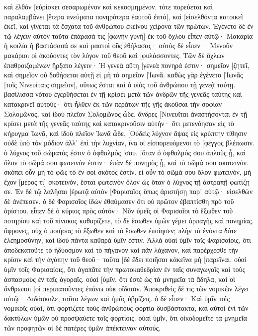 καὶ ἐλθὸν [εὑρίσκει σεσαρωμένον καὶ κεκοσμημένον. 
τότε πορεύεται καὶ παραλαμβάνει [ἕτερα πνεύματα πονηρότερα ἑαυτοῦ ἑπτά], καὶ [εἰσελθόντα κατοικεῖ ἐκεῖ, καὶ γίνεται τὰ ἔσχατα τοῦ ἀνθρώπου ἐκείνου χείρονα τῶν πρώτων. 
Ἐγένετο δὲ ἐν τῷ λέγειν αὐτὸν ταῦτα ἐπάρασά τις [φωνὴν γυνὴ] ἐκ τοῦ ὄχλου εἶπεν αὐτῷ· Μακαρία ἡ κοιλία ἡ βαστάσασά σε καὶ μαστοὶ οὓς ἐθήλασας· 
αὐτὸς δὲ εἶπεν· [Μενοῦν μακάριοι οἱ ἀκούοντες τὸν λόγον τοῦ θεοῦ καὶ [φυλάσσοντες. 
Τῶν δὲ ὄχλων ἐπαθροιζομένων ἤρξατο λέγειν· Ἡ γενεὰ αὕτη [γενεὰ πονηρά ἐστιν· σημεῖον [ζητεῖ, καὶ σημεῖον οὐ δοθήσεται αὐτῇ εἰ μὴ τὸ σημεῖον [Ἰωνᾶ. 
καθὼς γὰρ ἐγένετο [Ἰωνᾶς [τοῖς Νινευίταις σημεῖον], οὕτως ἔσται καὶ ὁ υἱὸς τοῦ ἀνθρώπου τῇ γενεᾷ ταύτῃ. 
βασίλισσα νότου ἐγερθήσεται ἐν τῇ κρίσει μετὰ τῶν ἀνδρῶν τῆς γενεᾶς ταύτης καὶ κατακρινεῖ αὐτούς· ὅτι ἦλθεν ἐκ τῶν περάτων τῆς γῆς ἀκοῦσαι τὴν σοφίαν Σολομῶνος, καὶ ἰδοὺ πλεῖον Σολομῶνος ὧδε. 
ἄνδρες [Νινευῖται ἀναστήσονται ἐν τῇ κρίσει μετὰ τῆς γενεᾶς ταύτης καὶ κατακρινοῦσιν αὐτήν· ὅτι μετενόησαν εἰς τὸ κήρυγμα Ἰωνᾶ, καὶ ἰδοὺ πλεῖον Ἰωνᾶ ὧδε. 
[Οὐδεὶς λύχνον ἅψας εἰς κρύπτην τίθησιν οὐδὲ ὑπὸ τὸν μόδιον ἀλλ᾽ ἐπὶ τὴν λυχνίαν, ἵνα οἱ εἰσπορευόμενοι τὸ [φέγγος βλέπωσιν. 
ὁ λύχνος τοῦ σώματός ἐστιν ὁ ὀφθαλμός [σου. [ὅταν ὁ ὀφθαλμός σου ἁπλοῦς ᾖ, καὶ ὅλον τὸ σῶμά σου φωτεινόν ἐστιν· ἐπὰν δὲ πονηρὸς ᾖ, καὶ τὸ σῶμά σου σκοτεινόν. 
σκόπει οὖν μὴ τὸ φῶς τὸ ἐν σοὶ σκότος ἐστίν. 
εἰ οὖν τὸ σῶμά σου ὅλον φωτεινόν, μὴ ἔχον [μέρος τι] σκοτεινόν, ἔσται φωτεινὸν ὅλον ὡς ὅταν ὁ λύχνος τῇ ἀστραπῇ φωτίζῃ σε. 
Ἐν δὲ τῷ λαλῆσαι [ἐρωτᾷ αὐτὸν [Φαρισαῖος ὅπως ἀριστήσῃ παρ᾽ αὐτῷ· εἰσελθὼν δὲ ἀνέπεσεν. 
ὁ δὲ Φαρισαῖος ἰδὼν ἐθαύμασεν ὅτι οὐ πρῶτον ἐβαπτίσθη πρὸ τοῦ ἀρίστου. 
εἶπεν δὲ ὁ κύριος πρὸς αὐτόν· Νῦν ὑμεῖς οἱ Φαρισαῖοι τὸ ἔξωθεν τοῦ ποτηρίου καὶ τοῦ πίνακος καθαρίζετε, τὸ δὲ ἔσωθεν ὑμῶν γέμει ἁρπαγῆς καὶ πονηρίας. 
ἄφρονες, οὐχ ὁ ποιήσας τὸ ἔξωθεν καὶ τὸ ἔσωθεν ἐποίησεν; 
πλὴν τὰ ἐνόντα δότε ἐλεημοσύνην, καὶ ἰδοὺ πάντα καθαρὰ ὑμῖν ἐστιν. 
Ἀλλὰ οὐαὶ ὑμῖν τοῖς Φαρισαίοις, ὅτι ἀποδεκατοῦτε τὸ ἡδύοσμον καὶ τὸ πήγανον καὶ πᾶν λάχανον, καὶ παρέρχεσθε τὴν κρίσιν καὶ τὴν ἀγάπην τοῦ θεοῦ· ταῦτα [δὲ ἔδει ποιῆσαι κἀκεῖνα μὴ [παρεῖναι. 
οὐαὶ ὑμῖν τοῖς Φαρισαίοις, ὅτι ἀγαπᾶτε τὴν πρωτοκαθεδρίαν ἐν ταῖς συναγωγαῖς καὶ τοὺς ἀσπασμοὺς ἐν ταῖς ἀγοραῖς. 
οὐαὶ [ὑμῖν, ὅτι ἐστὲ ὡς τὰ μνημεῖα τὰ ἄδηλα, καὶ οἱ ἄνθρωποι [οἱ περιπατοῦντες ἐπάνω οὐκ οἴδασιν. 
Ἀποκριθεὶς δέ τις τῶν νομικῶν λέγει αὐτῷ· Διδάσκαλε, ταῦτα λέγων καὶ ἡμᾶς ὑβρίζεις. 
ὁ δὲ εἶπεν· Καὶ ὑμῖν τοῖς νομικοῖς οὐαί, ὅτι φορτίζετε τοὺς ἀνθρώπους φορτία δυσβάστακτα, καὶ αὐτοὶ ἑνὶ τῶν δακτύλων ὑμῶν οὐ προσψαύετε τοῖς φορτίοις. 
οὐαὶ ὑμῖν, ὅτι οἰκοδομεῖτε τὰ μνημεῖα τῶν προφητῶν οἱ δὲ πατέρες ὑμῶν ἀπέκτειναν αὐτούς. 
